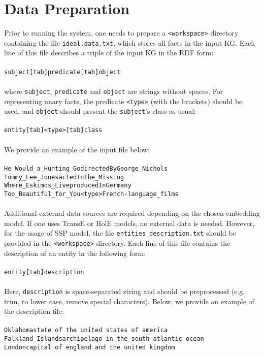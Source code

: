\section{Data Preparation}
Prior to running the system, one needs to prepare a \texttt{<workspace>} directory containing the file \texttt{ideal.data.txt}, which stores all facts in the input KG. Each line of this file describes a triple of the input KG in the RDF form:\\
\\
\texttt{subject[tab]predicate[tab]object}\\
\\
where \texttt{subject}, \texttt{predicate} and \texttt{object} are strings without spaces. For representing unary facts, the predicate \texttt{<type>} (with the brackets) should be used, and \texttt{object} should present the \texttt{subject}'s class as usual:\\
\\
\texttt{entity[tab]<type>[tab]class}\\
\\
We provide an example of the input file below:\\
\\
\texttt{He\_Would\_a\_Hunting\_Go\;\;\;\;\;\;\;\;\;\;directedBy\;\;\;\;\;\;\;\;\;\;George\_Nichols}\\
\texttt{Tommy\_Lee\_Jones\;\;\;\;\;\;\;\;\;\;actedIn\;\;\;\;\;\;\;\;\;\;The\_Missing}\\
\texttt{Where\_Eskimos\_Live\;\;\;\;\;\;\;\;\;\;producedIn\;\;\;\;\;\;\;\;\;\;Germany}\\
\texttt{Too\_Beautiful\_for\_You\;\;\;\;\;\;\;\;\;\;<type>\;\;\;\;\;\;\;\;\;\;French-language\_films}\\
\\
Additional external data sources are required depending on the chosen embedding model. If one uses TransE or HolE models, no external data is needed. However, for the usage of SSP model, the file \texttt{entities\_description.txt} should be provided in the \texttt{<workspace>} directory. Each line of this file contains the description of an entity in the following form:\\
\\
\texttt{entity[tab]description}\\
\\
Here, \texttt{description} is space-separated string and should be preprocessed (e.g. trim, to lower case, remove special characters). Below, we provide an example of the description file:\\
\\
\texttt{Oklahoma\;\;\;\;\;\;\;\;\;\;state of the united states of america}\\
\texttt{Falkland\_Islands\;\;\;\;\;\;\;\;\;\;archipelago in the south atlantic ocean}\\
\texttt{London\;\;\;\;\;\;\;\;\;\;capital of england and the united kingdom}

